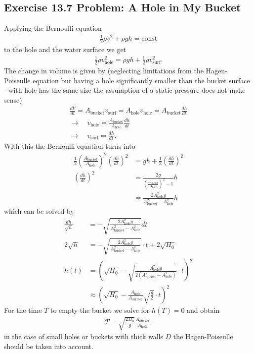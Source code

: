 \documentclass[../main.tex]{subfiles}
\begin{document}
\subsection{Exercise 13.7 Problem: A Hole in My Bucket}
Applying the Bernoulli equation 
\begin{align}
    \frac{1}{2}\rho v^2 + \rho g h = \text{const}
\end{align}
to the hole and the water surface we get
\begin{align}
    \frac{1}{2}\rho v_\text{hole}^2 = \rho g h + \frac{1}{2}\rho v_\text{surf}^2.
\end{align}
The change in volume is given by (neglecting limitations from the Hagen-Poiseulle equation but having a hole significantly smaller than the bucket surface - with hole has the same size the assumption of a static pressure does not make sense)
\begin{align}
    \frac{dV}{dt}=A_\text{bucket}v_\text{surf}=A_\text{hole}v_\text{hole}=A_\text{bucket}\frac{dh}{dt}\\
    \rightarrow\quad v_\text{hole}=\frac{A_\text{bucket}}{A_\text{hole}}\frac{dh}{dt}\\
    \rightarrow\quad v_\text{surf}=\frac{dh}{dt}.
\end{align}
With this the Bernoulli equation turns into
\begin{align}
    \frac{1}{2}\left(\frac{A_\text{bucket}}{A_\text{hole}}\right)^2\left(\frac{dh}{dt}\right)^2&=gh+\frac{1}{2}\left(\frac{dh}{dt}\right)^2\\
    \left(\frac{dh}{dt}\right)^2&=\frac{2g}{\left(\frac{A_\text{bucket}}{A_\text{hole}}\right)^2-1}h\\
    &=\frac{2A_\text{hole}^2g}{A_\text{bucket}^2-A_\text{hole}^2}h
\end{align}
which can be solved by
\begin{align}
    \frac{dh}{\sqrt{h}}&=-\sqrt{\frac{2A_\text{hole}^2g}{A_\text{bucket}^2-A_\text{hole}^2}}dt\\
    2\sqrt{h}&=-\sqrt{\frac{2A_\text{hole}^2g}{A_\text{bucket}^2-A_\text{hole}^2}}\cdot t+2\sqrt{H_0}\\
    h(t)&=\left(\sqrt{H_0}-\sqrt{\frac{A_\text{hole}^2g}{2(A_\text{bucket}^2-A_\text{hole}^2)}}\cdot t\right)^2\\
    &\approx\left(\sqrt{H_0}-\frac{A_\text{hole}}{A_\text{surface}}\sqrt{\frac{g}{2}}\cdot t\right)^2
\end{align}
For the time $T$ to empty the bucket we solve for $h(T)=0$ and obtain
\begin{align}
    T = \sqrt{\frac{2H_0}{g}}\frac{A_\text{bucket}}{A_\text{hole}}.
\end{align}
in the case of small holes or buckets with thick walls $D$ the Hagen-Poiseulle should be taken into account.
\end{document}
